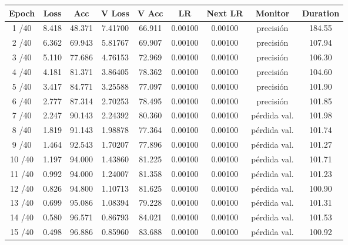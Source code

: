         
        \begin{table}[ht]
            \small
            \centering
            \begin{tabular}{|c|c|c|c|c|c|c|c|c|}
            \hline
            \textbf{Epoch} & \textbf{Loss} & \textbf{Acc} & \textbf{V Loss} & \textbf{V Acc} & \textbf{LR} & \textbf{Next LR} & \textbf{Monitor} & \textbf{Duration} \\ \hline
            1 /40  & 8.418  & 48.371 & 7.41700 & 66.911 & 0.00100 & 0.00100 & precisión & 184.55 \\ \hline
            2 /40  & 6.362  & 69.943 & 5.81767 & 69.907 & 0.00100 & 0.00100 & precisión & 107.94 \\ \hline
            3 /40  & 5.110  & 77.686 & 4.76153 & 72.969 & 0.00100 & 0.00100 & precisión & 106.30 \\ \hline
            4 /40  & 4.181  & 81.371 & 3.86405 & 78.362 & 0.00100 & 0.00100 & precisión & 104.60 \\ \hline
            5 /40  & 3.417  & 84.771 & 3.25588 & 77.097 & 0.00100 & 0.00100 & precisión & 101.90 \\ \hline
            6 /40  & 2.777  & 87.314 & 2.70253 & 78.495 & 0.00100 & 0.00100 & precisión & 101.85 \\ \hline
            7 /40  & 2.247  & 90.143 & 2.24392 & 80.360 & 0.00100 & 0.00100 & pérdida val. & 101.98 \\ \hline
            8 /40  & 1.819  & 91.143 & 1.98878 & 77.364 & 0.00100 & 0.00100 & pérdida val. & 101.74 \\ \hline
            9 /40  & 1.464  & 92.543 & 1.70207 & 77.896 & 0.00100 & 0.00100 & pérdida val. & 101.27 \\ \hline
            10 /40 & 1.197  & 94.000 & 1.43860 & 81.225 & 0.00100 & 0.00100 & pérdida val. & 101.71 \\ \hline
            11 /40 & 0.992  & 94.000 & 1.24007 & 81.358 & 0.00100 & 0.00100 & pérdida val. & 101.23 \\ \hline
            12 /40 & 0.826  & 94.800 & 1.10713 & 81.625 & 0.00100 & 0.00100 & pérdida val. & 100.90 \\ \hline
            13 /40 & 0.699  & 95.086 & 1.08394 & 79.228 & 0.00100 & 0.00100 & pérdida val. & 101.31 \\ \hline
            14 /40 & 0.580  & 96.571 & 0.86793 & 84.021 & 0.00100 & 0.00100 & pérdida val. & 101.53 \\ \hline
            15 /40 & 0.498  & 96.886 & 0.85960 & 83.688 & 0.00100 & 0.00100 & pérdida val. & 100.92 \\ \hline

\end{tabular}
\end{table}
